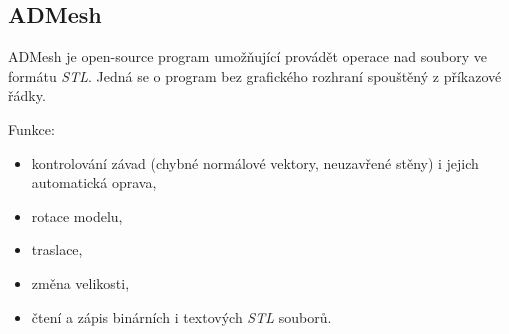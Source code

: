 \subsection{ADMesh}
ADMesh \autocite{ADMesh} je open-source program umožňující provádět operace nad soubory ve formátu \textit{\gls{STL}}. Jedná se o program bez grafického rozhraní spouštěný z příkazové řádky. 

Funkce:
\begin{itemize}
    \item kontrolování závad (chybné normálové vektory, neuzavřené stěny) i jejich automatická oprava,
    \item rotace modelu,
    \item traslace,
    \item změna velikosti,
    \item čtení a zápis binárních i textových \textit{\gls{STL}} souborů.
\end{itemize}